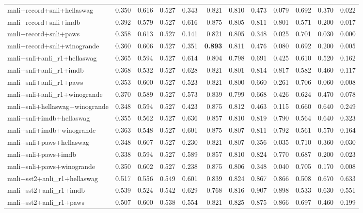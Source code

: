 \begin{table}[t]
\begin{tabular}{lrrrrrrrrrrr}
    mnli+record+snli+hellaswag & 0.350 & 0.616 & 0.527 & 0.343 & 0.821 & 0.810 & 0.473 & 0.079 & 0.692 & 0.370 & 0.022 \\
    mnli+record+snli+imdb & 0.392 & 0.579 & 0.527 & 0.616 & 0.875 & 0.805 & 0.811 & 0.801 & 0.571 & 0.200 & 0.017 \\
    mnli+record+snli+paws & 0.358 & 0.613 & 0.527 & 0.141 & 0.821 & 0.805 & 0.348 & 0.025 & 0.701 & 0.030 & 0.000 \\
    mnli+record+snli+winogrande & 0.360 & 0.606 & 0.527 & 0.351 & \textbf{0.893} & 0.811 & 0.476 & 0.080 & 0.692 & 0.200 & 0.005 \\
    mnli+snli+anli\_r1+hellaswag & 0.365 & 0.594 & 0.527 & 0.614 & 0.804 & 0.798 & 0.691 & 0.425 & 0.610 & 0.520 & 0.162 \\
    mnli+snli+anli\_r1+imdb & 0.368 & 0.532 & 0.527 & 0.628 & 0.821 & 0.801 & 0.814 & 0.817 & 0.582 & 0.460 & 0.117 \\
    mnli+snli+anli\_r1+paws & 0.353 & 0.600 & 0.527 & 0.523 & 0.821 & 0.800 & 0.660 & 0.261 & 0.706 & 0.060 & 0.008 \\
    mnli+snli+anli\_r1+winogrande & 0.370 & 0.589 & 0.527 & 0.573 & 0.839 & 0.799 & 0.668 & 0.426 & 0.624 & 0.470 & 0.078 \\
    mnli+snli+hellaswag+winogrande & 0.348 & 0.594 & 0.527 & 0.423 & 0.875 & 0.812 & 0.463 & 0.115 & 0.660 & 0.640 & 0.249 \\
    mnli+snli+imdb+hellaswag & 0.355 & 0.562 & 0.527 & 0.636 & 0.857 & 0.810 & 0.819 & 0.790 & 0.564 & 0.640 & 0.323 \\
    mnli+snli+imdb+winogrande & 0.363 & 0.548 & 0.527 & 0.601 & 0.875 & 0.807 & 0.811 & 0.792 & 0.561 & 0.570 & 0.164 \\
    mnli+snli+paws+hellaswag & 0.348 & 0.607 & 0.527 & 0.230 & 0.821 & 0.807 & 0.356 & 0.035 & 0.710 & 0.360 & 0.030 \\
    mnli+snli+paws+imdb & 0.338 & 0.594 & 0.527 & 0.589 & 0.857 & 0.810 & 0.824 & 0.770 & 0.687 & 0.200 & 0.023 \\
    mnli+snli+paws+winogrande & 0.350 & 0.602 & 0.527 & 0.238 & 0.875 & 0.806 & 0.348 & 0.040 & 0.705 & 0.170 & 0.008 \\
    mnli+sst2+anli\_r1+hellaswag & 0.517 & 0.556 & 0.549 & 0.601 & 0.839 & 0.824 & 0.867 & 0.866 & 0.508 & 0.670 & 0.633 \\
    mnli+sst2+anli\_r1+imdb & 0.539 & 0.524 & 0.542 & 0.629 & 0.768 & 0.816 & 0.907 & 0.898 & 0.533 & 0.630 & 0.551 \\
    mnli+sst2+anli\_r1+paws & 0.507 & 0.600 & 0.538 & 0.554 & 0.821 & 0.825 & 0.875 & 0.866 & 0.697 & 0.460 & 0.199 \\

\end{tabular}
\end{table}
